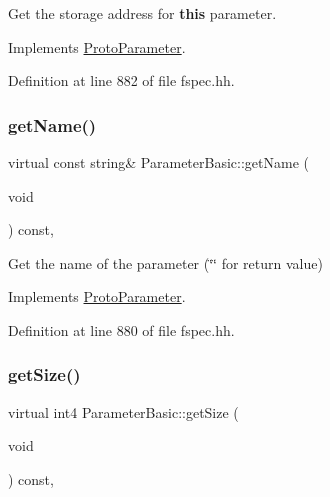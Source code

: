 Get the storage address for {\bfseries{this}} parameter. 



Implements \mbox{\hyperlink{class_proto_parameter_a33c604ed7e06ae0ca6ac491b46739343}{Proto\+Parameter}}.



Definition at line 882 of file fspec.\+hh.

\mbox{\label{class_parameter_basic_aa8bfb0e008ccc1953627e5415e64fadb}} 
\subsubsection{\texorpdfstring{getName()}{getName()}}
{\footnotesize\ttfamily virtual const string\& Parameter\+Basic\+::get\+Name (\begin{DoxyParamCaption}\item[{void}]{ }\end{DoxyParamCaption}) const\hspace{0.3cm}{\ttfamily [inline]}, {\ttfamily [virtual]}}



Get the name of the parameter (\char`\"{}\char`\"{} for return value) 



Implements \mbox{\hyperlink{class_proto_parameter_a03d8c36596d1564b5366295ff63fc182}{Proto\+Parameter}}.



Definition at line 880 of file fspec.\+hh.

\mbox{\label{class_parameter_basic_a96b3cef1901c8f4b7591551ea7b4d407}} 
\subsubsection{\texorpdfstring{getSize()}{getSize()}}
{\footnotesize\ttfamily virtual int4 Parameter\+Basic\+::get\+Size (\begin{DoxyParamCaption}\item[{void}]{ }\end{DoxyParamCaption}) const\hspace{0.3cm}{\ttfamily [inline]}, {\ttfamily [virtual]}}



